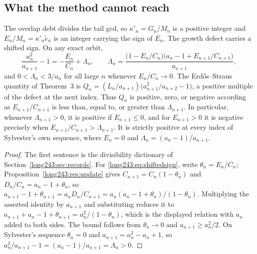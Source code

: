 \documentclass[11pt]{article}
\begin{document}
\subsection{What the method cannot reach}

\begin{proposition}\label{long243:res:classicalhalfspace}
The overlap debt divides the tail gcd, so $\kappa'_n=G_n/M_n$ is a positive
integer and $E_n/M_n=\kappa'_n\tilde e_n$ is an integer carrying the sign of
$E_n$.  The growth defect carries a shifted sign.  On any exact orbit,
\begin{equation}\label{long243:eq:shiftedsign}
 \frac{a_n^2}{a_{n+1}}-1=-\frac{E_n}{C_n}+\Lambda_n,
 \qquad
 \Lambda_n=\frac{\bigl(1-E_n/C_n\bigr)\bigl(a_n-1+E_{n+1}/C_{n+1}\bigr)}{a_{n+1}},
\end{equation}
and $0<\Lambda_n<3/a_n$ for all large $n$ whenever $E_n/C_n\to0$.  The
Erd\H{o}s--Straus quantity of Theorem~3 is
$Q_n=(L_n/a_{n+1})\bigl(a_{n+1}^2/a_{n+2}-1\bigr)$, a positive multiple of the
defect at the next index.  Thus $Q_n$ is positive, zero, or negative according
as $E_{n+1}/C_{n+1}$ is less than, equal to, or greater than
$\Lambda_{n+1}$.  In particular, whenever $\Lambda_{n+1}>0$, it is positive
if $E_{n+1}\le0$, and for $E_{n+1}>0$ it is negative precisely when
$E_{n+1}/C_{n+1}>\Lambda_{n+1}$.  It is strictly positive
at every index of Sylvester's own sequence, where $E_n=0$ and
$\Lambda_n=(a_n-1)/a_{n+1}$.
\end{proposition}

\begin{proof}
The first sentence is the divisibility dictionary of
Section~\ref{long243:sec:records}.  For \eqref{long243:eq:shiftedsign}, write
$\theta_n=E_n/C_n$; Proposition~\ref{long243:res:update} gives $C_{n+1}=C_n(1-\theta_n)$
and $D_n/C_n=a_n-1+\theta_n$, so
$a_{n+1}-1+\theta_{n+1}=a_nD_n/C_{n+1}=a_n(a_n-1+\theta_n)/(1-\theta_n)$.
Multiplying the asserted identity by $a_{n+1}$ and substituting reduces it to
$a_{n+1}+a_n-1+\theta_{n+1}=a_n^2/(1-\theta_n)$, which is the displayed
relation with $a_n$ added to both sides.  The bound follows from
$\theta_n\to0$ and $a_{n+1}\ge a_n^2/2$.  On Sylvester's sequence
$\theta_n=0$ and $a_{n+1}=a_n^2-a_n+1$, so
$a_n^2/a_{n+1}-1=(a_n-1)/a_{n+1}=\Lambda_n>0$.
\end{proof}
\end{document}
